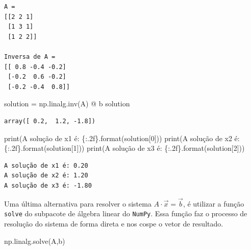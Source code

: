 \documentclass[
  brazilian,
  letterpaper,
  DIV=11,
  numbers=noendperiod]{scrreprt}
\newenvironment{Shaded}{\begin{snugshade}}{\end{snugshade}}
\newcommand{\BuiltInTok}[1]{\textcolor[rgb]{0.00,0.23,0.31}{#1}}
\newcommand{\DecValTok}[1]{\textcolor[rgb]{0.68,0.00,0.00}{#1}}
\newcommand{\NormalTok}[1]{\textcolor[rgb]{0.00,0.23,0.31}{#1}}
\newcommand{\OperatorTok}[1]{\textcolor[rgb]{0.37,0.37,0.37}{#1}}
\newcommand{\SpecialCharTok}[1]{\textcolor[rgb]{0.37,0.37,0.37}{#1}}
\newcommand{\StringTok}[1]{\textcolor[rgb]{0.13,0.47,0.30}{#1}}
\begin{document}
\begin{verbatim}
A =
[[2 2 1]
 [1 3 1]
 [1 2 2]]

Inversa de A = 
[[ 0.8 -0.4 -0.2]
 [-0.2  0.6 -0.2]
 [-0.2 -0.4  0.8]]
\end{verbatim}

\begin{Shaded}
\begin{Highlighting}[]
\NormalTok{solution }\OperatorTok{=}\NormalTok{ np.linalg.inv(A) }\OperatorTok{@}\NormalTok{ b}
\NormalTok{solution}
\end{Highlighting}
\end{Shaded}

\begin{verbatim}
array([ 0.2,  1.2, -1.8])
\end{verbatim}

\begin{Shaded}
\begin{Highlighting}[]
\BuiltInTok{print}\NormalTok{(}\StringTok{\textquotesingle{}A solução de x1 é: }\SpecialCharTok{\{:.2f\}}\StringTok{\textquotesingle{}}\NormalTok{.}\BuiltInTok{format}\NormalTok{(solution[}\DecValTok{0}\NormalTok{]))}
\BuiltInTok{print}\NormalTok{(}\StringTok{\textquotesingle{}A solução de x2 é: }\SpecialCharTok{\{:.2f\}}\StringTok{\textquotesingle{}}\NormalTok{.}\BuiltInTok{format}\NormalTok{(solution[}\DecValTok{1}\NormalTok{]))}
\BuiltInTok{print}\NormalTok{(}\StringTok{\textquotesingle{}A solução de x3 é: }\SpecialCharTok{\{:.2f\}}\StringTok{\textquotesingle{}}\NormalTok{.}\BuiltInTok{format}\NormalTok{(solution[}\DecValTok{2}\NormalTok{]))}
\end{Highlighting}
\end{Shaded}

\begin{verbatim}
A solução de x1 é: 0.20
A solução de x2 é: 1.20
A solução de x3 é: -1.80
\end{verbatim}

Uma última alternativa para resolver o sistema
\(A\cdot \vec{x} = \vec{b}\), é utilizar a função \texttt{solve} do
subpacote de álgebra linear do \texttt{NumPy}. Essa função faz o
processo de resolução do sistema de forma direta e nos cospe o vetor de
resultado.

\begin{Shaded}
\begin{Highlighting}[]
\NormalTok{np.linalg.solve(A,b)}
\end{Highlighting}
\end{Shaded}
\end{document}
